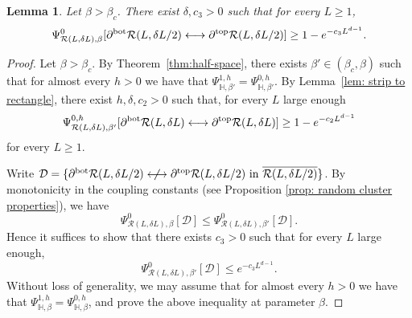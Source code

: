 \documentclass[11pt,a4paper]{article}
\numberwithin{equation}{section}
\theoremstyle{plain}
\newtheorem{Lem}[Thm]{Lemma}
\theoremstyle{definition}
\begin{document}
\begin{Lem}\label{lem: large to free bc} Let $\beta>\beta_c$. There exist $\delta,c_3>0$ such that for every $L\geq 1$,
\begin{equation}\label{eq: large to free bc}
\Psi^0_{\mathcal R(L,\delta L),\beta}[ \partial^{\rm bot} \mathcal R(L, \delta L/2) \longleftrightarrow \partial^{\rm top} \mathcal R(L, \delta L/2)] \geq 1 - e^{-c_3 L^{d-1}}. 
\end{equation}
\end{Lem}
\begin{proof}
Let $\beta>\beta_c$. By Theorem~\ref{thm:half-space}, there exists $\beta'\in (\beta_c,\beta)$ such that for almost every $h>0$ we have that 
$\Psi^{1,h}_{\mathbb{H},\beta'}= \Psi^{0,h}_{\mathbb{H},\beta'}$. By Lemma~\ref{lem: strip to rectangle}, there exist $h,\delta,c_2>0$ such that, for every $L$ large enough 
\begin{equation}
\Psi^{0,h}_{\mathcal R(L,\delta L),\beta'}[\partial^{{\rm bot}} \mathcal R(L, \delta L) \longleftrightarrow\partial^{{\rm top}} \mathcal R(L, \delta L)] \geq 1 - e^{-c_2 L^{d-1}}
\end{equation} 
for every $L\geq 1$.

Write $\mathcal{D}=\{\partial^{\rm bot} \mathcal R(L, \delta L/2) \centernot\longleftrightarrow \partial^{\rm top} \mathcal R(L, \delta L/2) \text{ in } \overline{\mathcal R(L, \delta L/2)}\}$. By monotonicity in the coupling constants (see Proposition \ref{prop: random cluster properties}), we have 
\begin{equation}
\Psi^0_{\mathcal R(L,\delta L),\beta}[ \mathcal{D}]\leq \Psi^0_{\mathcal R(L,\delta L),\beta'}[ \mathcal{D}].
\end{equation}
Hence it suffices to show that there exists $c_3>0$ such that for every $L$ large enough,
\begin{equation}
\Psi^0_{\mathcal R(L,\delta L),\beta'}[ \mathcal{D}] \leq e^{-c_3 L^{d-1}}. 
\end{equation}
Without loss of generality, we may assume that for almost every $h>0$ we have that 
$\Psi^{1,h}_{\mathbb{H},\beta}= \Psi^{0,h}_{\mathbb{H},\beta}$, and prove the above inequality at parameter $\beta$. 


\end{proof}
\end{document}
